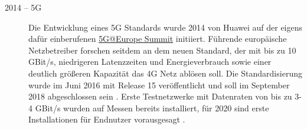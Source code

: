 \begin{description}
\item [2014 -- 5G]
Die Entwicklung eines 5G Standards wurde 2014 von Huawei auf der eigens dafür einberufenen \href{http://www.5gsummit.org/}{5G@Europe Summit} initiiert. Führende europäische Netzbetreiber forschen seitdem an dem neuen Standard, der mit bis zu 10 GBit/s, niedrigeren Latenzzeiten und Energieverbrauch sowie einer deutlich größeren Kapazität das 4G Netz ablösen soll. Die Standardisierung wurde im Juni 2016 mit Release 15 veröffentlicht und soll im September 2018 abgeschlossen sein . Erste Testnetzwerke mit Datenraten von bis zu 3-4 GBit/s wurden auf Messen bereits installiert, für 2020 sind erste Installationen für Endnutzer vorausgesagt \citep{lte-anbieter:5g}.
\end{description}